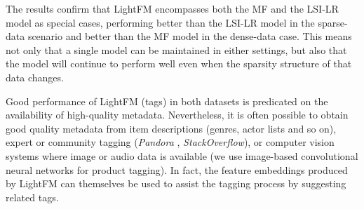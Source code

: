 \documentclass{sig-alternate}
\begin{document}
The results confirm that LightFM encompasses both the MF and the LSI-LR model as special cases, performing better than the LSI-LR model in the sparse-data scenario and better than the MF model in the dense-data case. This means not only that a single model can be maintained in either settings, but also that the model will continue to perform well even when the sparsity structure of that data changes.

Good performance of LightFM (tags) in both datasets is predicated on the availability of high-quality metadata. Nevertheless, it is often possible to obtain good quality metadata from item descriptions (genres, actor lists and so on), expert or community tagging (\emph{Pandora} \cite{westergren2007music}, \emph{StackOverflow}), or computer vision systems where image or audio data is available (we use image-based convolutional neural networks for product tagging). In fact, the feature embeddings produced by LightFM can themselves be used to assist the tagging process by suggesting related tags.
\end{document}
